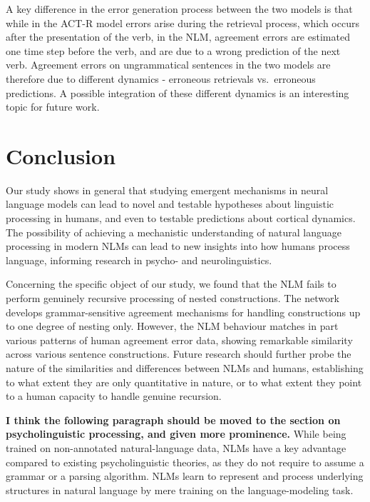 A key difference in the error generation process between the two models is that while in the ACT-R model errors arise during the retrieval process, which occurs after the presentation of the verb, in the NLM, agreement errors are estimated one time step before the verb, and are due to a wrong prediction of the next verb. Agreement errors on ungrammatical sentences in the two models are therefore due to different dynamics - erroneous retrievals vs.~erroneous predictions. A possible integration of these different dynamics is an interesting topic for future work.

\section{Conclusion}
Our study shows in general that studying emergent mechanisms in neural language models can lead to novel and testable hypotheses about linguistic processing in humans, and even to testable predictions about cortical dynamics. The possibility of achieving a mechanistic understanding of natural language processing in modern NLMs can lead to new insights into how humans process language, informing research in psycho- and neurolinguistics.

Concerning the specific object of our study, we found that the NLM fails to perform genuinely recursive processing of nested constructions. The network develops grammar-sensitive agreement mechanisms for handling  constructions up to one degree of nesting only. However, the NLM behaviour matches in part various patterns of human agreement error data, showing remarkable similarity across various sentence constructions. Future research should further probe the nature of the similarities and differences between NLMs and humans, establishing to what extent they are only quantitative in nature, or to what extent they point to a human capacity to handle genuine recursion.

\textbf{I think the following paragraph should be moved to the section on psycholinguistic processing, and given more prominence.} While being trained on non-annotated natural-language data, NLMs have a key advantage compared to existing psycholinguistic theories, as they do not require to assume a grammar or a parsing algorithm. NLMs learn to represent and process underlying structures in natural language by mere training on the language-modeling task. 


